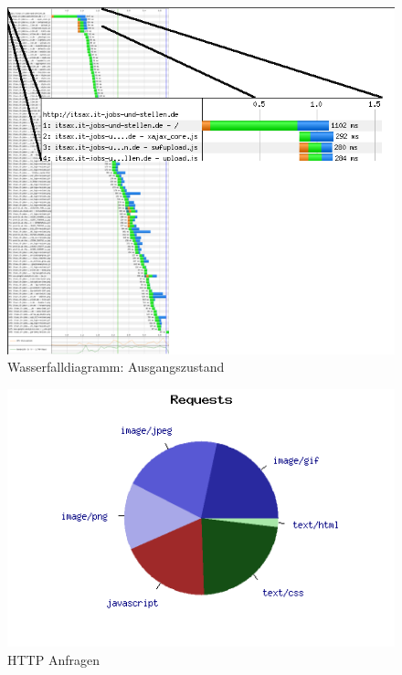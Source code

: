 \begin{figure}[htbp]
  \centering
  \includegraphics[scale=0.5]{material/start_waterfall_edited.png}
  \caption{Wasserfalldiagramm: Ausgangszustand}
  
  \label{fig:startwaterfall}
\end{figure}
\begin{figure}[htbp]
  \centering
  \includegraphics[scale=0.5]{material/start_request_pie.png}
  \caption{HTTP Anfragen}
  \label{fig:startrequest}
\end{figure}

